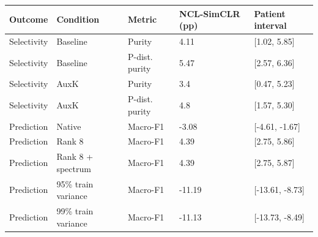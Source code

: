 \begin{tabular}{lllll}
\toprule
Outcome & Condition & Metric & NCL-SimCLR (pp) & Patient interval \\
\midrule
Selectivity & Baseline & Purity & 4.11 & [1.02, 5.85] \\
Selectivity & Baseline & P-dist. purity & 5.47 & [2.57, 6.36] \\
Selectivity & AuxK & Purity & 3.4 & [0.47, 5.23] \\
Selectivity & AuxK & P-dist. purity & 4.8 & [1.57, 5.30] \\
Prediction & Native & Macro-F1 & -3.08 & [-4.61, -1.67] \\
Prediction & Rank 8 & Macro-F1 & 4.39 & [2.75, 5.86] \\
Prediction & Rank 8 + spectrum & Macro-F1 & 4.39 & [2.75, 5.87] \\
Prediction & 95\% train variance & Macro-F1 & -11.19 & [-13.61, -8.73] \\
Prediction & 99\% train variance & Macro-F1 & -11.13 & [-13.73, -8.49] \\
\bottomrule
\end{tabular}
